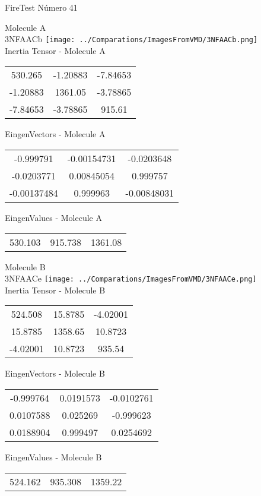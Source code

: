 \vtab[-2cm]
\begin{center}
{\large FireTest \tab Número 41}
\end{center}
\begin{multicols}{2}
\begin{center}

Molecule A \\ 
3NFAACb
\texttt{[image: ../Comparations/ImagesFromVMD/3NFAACb.png]}
\\
Inertia Tensor - Molecule A \\
\vtab

\begin{tabular}{|c c c|}
530.265	 & 	-1.20883	 & 	-7.84653	 \\
-1.20883	 & 	1361.05	 & 	-3.78865	 \\
-7.84653	 & 	-3.78865	 & 	915.61
\end{tabular}

\vtab
 EingenVectors - Molecule A     \\
\vtab
\begin{tabular}{|c c c|}
-0.999791	 & 	-0.00154731	 & 	-0.0203648	 \\
-0.0203771	 & 	0.00845054	 & 	0.999757	 \\
-0.00137484	 & 	0.999963	 & 	-0.00848031
\end{tabular}

\vtab
 EingenValues - Molecule A     \\
\vtab
\begin{tabular}{|c c c|}
530.103	 & 	915.738	 & 	1361.08	 \\
\end{tabular}
\columnbreak

Molecule B \\ 
3NFAACe
\texttt{[image: ../Comparations/ImagesFromVMD/3NFAACe.png]}
\\
Inertia Tensor - Molecule B \\
\vtab

\begin{tabular}{|c c c|}
524.508	 & 	15.8785	 & 	-4.02001	 \\
15.8785	 & 	1358.65	 & 	10.8723	 \\
-4.02001	 & 	10.8723	 & 	935.54
\end{tabular}

\vtab
 EingenVectors - Molecule B     \\
\vtab
\begin{tabular}{|c c c|}
-0.999764	 & 	0.0191573	 & 	-0.0102761	 \\
0.0107588	 & 	0.025269	 & 	-0.999623	 \\
0.0188904	 & 	0.999497	 & 	0.0254692
\end{tabular}

\vtab
 EingenValues - Molecule B     \\
\vtab
\begin{tabular}{|c c c|}
524.162	 & 	935.308	 & 	1359.22	 \\
\end{tabular}

\end{center}
\end{multicols}
